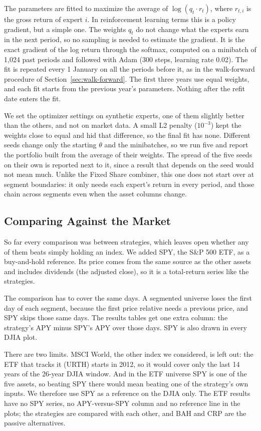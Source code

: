\documentclass[11pt]{article}
\begin{document}
The parameters are fitted to maximize the average of $\log(q_t \cdot r_t)$,
where $r_{t,i}$ is the gross return of expert $i$. In reinforcement
learning terms this is a policy gradient, but a simple one. The weights
$q_t$ do not change what the experts earn in the next period, so no
sampling is needed to estimate the gradient. It is the exact gradient of
the log return through the softmax, computed on a minibatch of 1,024 past
periods and followed with Adam (300 steps, learning rate 0.02). The fit is
repeated every 1 January on all the periods before it, as in the
walk-forward procedure of Section~\ref{sec:walk-forward}. The first three
years use equal weights, and each fit starts from the previous year's
parameters. Nothing after the refit date enters the fit.

We set the optimizer settings on synthetic experts, one of them slightly
better than the others, and not on market data. A small L2 penalty
($10^{-3}$) kept the weights close to equal and hid that difference, so
the final fit has none. Different seeds change only the starting $\theta$
and the minibatches, so we run five and report the portfolio built from
the average of their weights. The spread of the five seeds on their own
is reported next to it, since a result that depends on the seed would not
mean much. Unlike the Fixed Share combiner, this one does not start over
at segment boundaries: it only needs each expert's return in every period,
and those chain across segments even when the asset columns change.

\subsection{Comparing Against the Market}
\label{sec:spy}

So far every comparison was between strategies, which leaves open whether
any of them beats simply holding an index. We added SPY, the S\&P 500
ETF, as a buy-and-hold reference. Its price comes from the same source as
the other assets and includes dividends (the adjusted close), so it is a
total-return series like the strategies.

The comparison has to cover the same days. A segmented universe loses the
first day of each segment, because the first price relative needs a
previous price, and SPY skips those same days. The results tables get one
extra column: the strategy's APY minus SPY's APY over those days. SPY is
also drawn in every DJIA plot.

There are two limits. MSCI World, the other index we considered, is left
out: the ETF that tracks it (URTH) starts in 2012, so it would cover only
the last 14 years of the 26-year DJIA window. And in the ETF universe SPY
is one of the five assets, so beating SPY there would mean beating one of
the strategy's own inputs. We therefore use SPY as a reference on the DJIA
only. The ETF results have no SPY series, no APY-versus-SPY column and no
reference line in the plots; the strategies are compared with each other,
and BAH and CRP are the passive alternatives.
\end{document}
